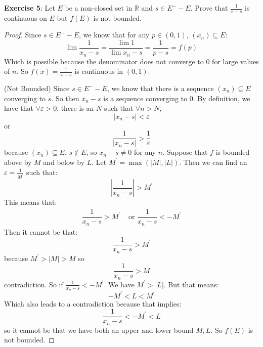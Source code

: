 \documentclass{article}
\begin{document}
\textbf{Exercise 5}: Let $E$ be a non-closed set in $\mathbb{R}$ and $s \in E^{-} - E$. Prove that $\frac{1}{x - s}$ is continuous on $E$ but $f(E)$ is not bounded.
    \begin{proof}
        Since $s \in E^{-} - E$, we know that for any $p \in (0, 1)$, $(x_{n}) \subseteq E$:
            \begin{equation*}
                \lim\dfrac{1}{x_{n} - s} = \dfrac{\lim 1}{\lim x_{n} - s} = \dfrac{1}{p - s} = f(p)
            \end{equation*}
        Which is possible because the denominator does not converge to $0$ for large values of $n$. So $f(x) = \frac{1}{x - s}$ is continuous in $(0, 1)$.

        (Not Bounded) Since $s \in E^{-} - E$, we know that there is a sequence $(x_{n}) \subseteq E$ converging to $s$. So then $x_{n} - s$ is a sequence converging to $0$. By definition, we have that $\forall \varepsilon> 0$, there is an $N$ such that $\forall n > N$,
            \begin{equation*}
                \lvert x_{n} - s \rvert < \varepsilon
            \end{equation*}
        or
            \begin{equation*}
                \dfrac{1}{\lvert x_{n} - s \rvert} >  \dfrac{1}{\varepsilon}
            \end{equation*}
        because $(x_{n}) \subseteq E$, $s \notin E$, so $x_{n} - s \neq 0$ for any $n$. Suppose that $f$ is bounded above by $M$ and below by $L$. Let $M^{\prime} = \max(\lvert M \rvert, \lvert L \rvert)$. Then we can find an $\varepsilon = \frac{1}{M^{\prime}}$ such that:
            \begin{equation*}
                \left\lvert \dfrac{1}{x_{n} - s} \right\rvert > M^{\prime}
            \end{equation*}
        This means that:
            \begin{align*}
                \dfrac{1}{x_{n} - s} > M^{\prime} &\text{ or } \dfrac{1}{x_{n} - s} < -M^{\prime}
            \end{align*}
        Then it cannot be that:
            \begin{equation*}
                \dfrac{1}{x_{n} - s} > M^{\prime}
            \end{equation*}
        because $M^{\prime} > \lvert M \rvert > M$ so 
            \begin{equation*}
                \dfrac{1}{x_{n} - s} > M
            \end{equation*}
        contradiction. So if $\frac{1}{x_{n} - s} < -M^{\prime}$. We have $M^{\prime} > \lvert L \rvert$. But that means:
            \begin{equation*}
                -M^{\prime} < L < M^{\prime}
            \end{equation*}
        Which also leads to a contradiction because that implies:
            \begin{equation*}
                \dfrac{1}{x_{n} - s} <  - M^{\prime} < L
            \end{equation*}
        so it cannot be that we have both an upper and lower bound $M, L$. So $f(E)$ is not bounded.
    \end{proof}
\end{document}
